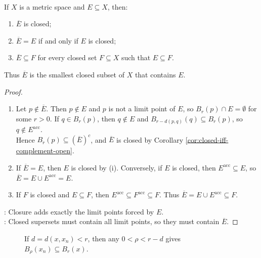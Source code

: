 \begin{theorem} \label{thm:closure-smallest-closed-containing-set} \\
If $X$ is a metric space and $E\subseteq X$, then:
\begin{enumerate}[label=(\roman*)]
\setlength{\itemsep}{0pt}
\item $\overline{E}$ is closed;
\item $\overline{E}=E$ if and only if $E$ is closed;
\item $\overline{E}\subseteq F$ for every closed set $F\subseteq X$ such that $E\subseteq F$.
\end{enumerate}
Thus $\overline{E}$ is the smallest closed subset of $X$ that contains $E$.
\begin{proof}
\begin{enumerate}[label=(\roman*)]
\setlength{\itemsep}{0pt}
\item Let $p\notin\overline{E}$. Then $p\notin E$ and $p$ is not a limit point of $E$, so $B_r(p)\cap E=\emptyset$ for some $r>0$. If $q\in B_r(p)$, then $q\notin E$ and $B_{r-d(p,q)}(q)\subseteq B_r(p)$, so $q\notin E^{\operatorname{acc}}$.\\
Hence $B_r(p)\subseteq(\overline{E})^c$, and $\overline{E}$ is closed by Corollary \ref{cor:closed-iff-complement-open}.
\item If $\overline{E}=E$, then $E$ is closed by (i). Conversely, if $E$ is closed, then $E^{\operatorname{acc}}\subseteq E$, so $\overline{E}=E\cup E^{\operatorname{acc}}=E$.
\item If $F$ is closed and $E\subseteq F$, then $E^{\operatorname{acc}}\subseteq F^{\operatorname{acc}}\subseteq F$. Thus $\overline{E}=E\cup E^{\operatorname{acc}}\subseteq F$.
\end{enumerate}
: Closure adds exactly the limit points forced by $E$.\\
: Closed supersets must contain all limit points, so they must contain $\overline{E}$.
\end{proof}
\end{theorem}

\begin{figure}[H]
  \centering
  
  \caption{If $d=d(x,x_n)<r$, then any $0<\rho<r-d$ gives
  $B_\rho(x_n)\subseteq B_r(x)$.}
  \label{fig:limit-point-closure-inner-ball}
\end{figure}

